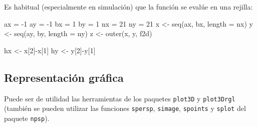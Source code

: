 \documentclass[
]{book}
\newenvironment{Shaded}{\begin{snugshade}}{\end{snugshade}}
\newcommand{\AttributeTok}[1]{\textcolor[rgb]{0.77,0.63,0.00}{#1}}
\newcommand{\DecValTok}[1]{\textcolor[rgb]{0.00,0.00,0.81}{#1}}
\newcommand{\FunctionTok}[1]{\textcolor[rgb]{0.00,0.00,0.00}{#1}}
\newcommand{\NormalTok}[1]{#1}
\newcommand{\OtherTok}[1]{\textcolor[rgb]{0.56,0.35,0.01}{#1}}
\newcommand{\SpecialCharTok}[1]{\textcolor[rgb]{0.00,0.00,0.00}{#1}}
\theoremstyle{break}
\theoremstyle{definition}
\theoremstyle{definition}
\theoremstyle{definition}
\theoremstyle{definition}
\theoremstyle{remark}
\begin{document}
Es habitual (especialmente en simulación) que la función se evalúe en una rejilla:

\begin{Shaded}
\begin{Highlighting}[]
\NormalTok{ax }\OtherTok{=} \SpecialCharTok{{-}}\DecValTok{1}
\NormalTok{ay }\OtherTok{=} \SpecialCharTok{{-}}\DecValTok{1}
\NormalTok{bx }\OtherTok{=} \DecValTok{1}
\NormalTok{by }\OtherTok{=} \DecValTok{1}
\NormalTok{nx }\OtherTok{=} \DecValTok{21}
\NormalTok{ny }\OtherTok{=} \DecValTok{21}
\NormalTok{x }\OtherTok{\textless{}{-}} \FunctionTok{seq}\NormalTok{(ax, bx, }\AttributeTok{length =}\NormalTok{ nx)}
\NormalTok{y }\OtherTok{\textless{}{-}} \FunctionTok{seq}\NormalTok{(ay, by, }\AttributeTok{length =}\NormalTok{ ny)}
\NormalTok{z }\OtherTok{\textless{}{-}} \FunctionTok{outer}\NormalTok{(x, y, f2d)}

\NormalTok{hx }\OtherTok{\textless{}{-}}\NormalTok{ x[}\DecValTok{2}\NormalTok{]}\SpecialCharTok{{-}}\NormalTok{x[}\DecValTok{1}\NormalTok{]}
\NormalTok{hy }\OtherTok{\textless{}{-}}\NormalTok{ y[}\DecValTok{2}\NormalTok{]}\SpecialCharTok{{-}}\NormalTok{y[}\DecValTok{1}\NormalTok{]}
\end{Highlighting}
\end{Shaded}

\hypertarget{representaciuxf3n-gruxe1fica}{%
\subsection{Representación gráfica}\label{representaciuxf3n-gruxe1fica}}

Puede ser de utilidad las herramientas de los paquetes \texttt{plot3D} y \texttt{plot3Drgl}
(también se pueden utilizar las funciones \texttt{spersp}, \texttt{simage}, \texttt{spoints} y \texttt{splot}
del paquete \texttt{npsp}).
\end{document}
